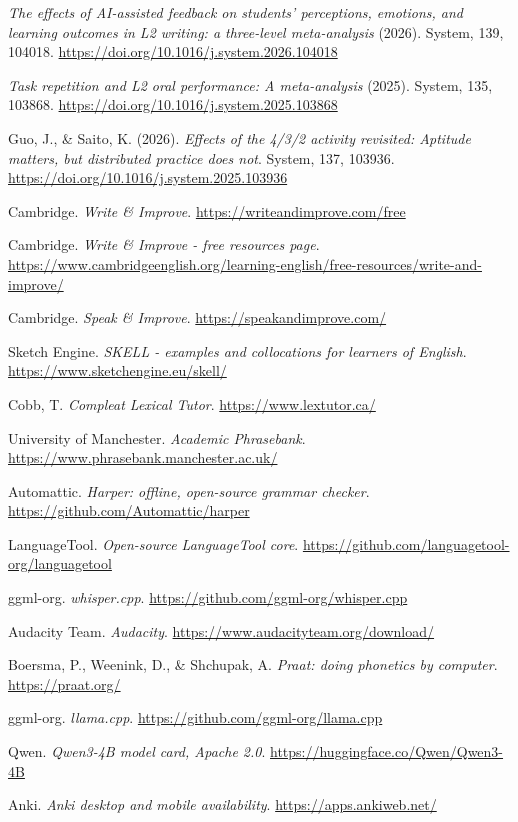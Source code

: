 \documentclass[11pt,a4paper]{article}
\begin{document}
\begin{enumerate}[label={[R\arabic*]},leftmargin=2.4em]
\item \textit{The effects of AI-assisted feedback on students' perceptions, emotions, and learning outcomes in L2 writing: a three-level meta-analysis} (2026). System, 139, 104018. \url{https://doi.org/10.1016/j.system.2026.104018}
\item \textit{Task repetition and L2 oral performance: A meta-analysis} (2025). System, 135, 103868. \url{https://doi.org/10.1016/j.system.2025.103868}
\item Guo, J., \& Saito, K. (2026). \textit{Effects of the 4/3/2 activity revisited: Aptitude matters, but distributed practice does not}. System, 137, 103936. \url{https://doi.org/10.1016/j.system.2025.103936}
\item Cambridge. \textit{Write \& Improve}. \url{https://writeandimprove.com/free}
\item Cambridge. \textit{Write \& Improve - free resources page}. \url{https://www.cambridgeenglish.org/learning-english/free-resources/write-and-improve/}
\item Cambridge. \textit{Speak \& Improve}. \url{https://speakandimprove.com/}
\item Sketch Engine. \textit{SKELL - examples and collocations for learners of English}. \url{https://www.sketchengine.eu/skell/}
\item Cobb, T. \textit{Compleat Lexical Tutor}. \url{https://www.lextutor.ca/}
\item University of Manchester. \textit{Academic Phrasebank}. \url{https://www.phrasebank.manchester.ac.uk/}
\item Automattic. \textit{Harper: offline, open-source grammar checker}. \url{https://github.com/Automattic/harper}
\item LanguageTool. \textit{Open-source LanguageTool core}. \url{https://github.com/languagetool-org/languagetool}
\item ggml-org. \textit{whisper.cpp}. \url{https://github.com/ggml-org/whisper.cpp}
\item Audacity Team. \textit{Audacity}. \url{https://www.audacityteam.org/download/}
\item Boersma, P., Weenink, D., \& Shchupak, A. \textit{Praat: doing phonetics by computer}. \url{https://praat.org/}
\item ggml-org. \textit{llama.cpp}. \url{https://github.com/ggml-org/llama.cpp}
\item Qwen. \textit{Qwen3-4B model card, Apache 2.0}. \url{https://huggingface.co/Qwen/Qwen3-4B}
\item Anki. \textit{Anki desktop and mobile availability}. \url{https://apps.ankiweb.net/}
\end{enumerate}
\end{document}
